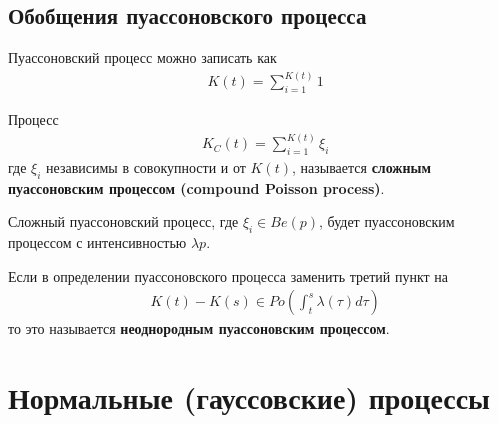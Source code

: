 \newpage
{}
\subsection{Обобщения пуассоновского процесса}
Пуассоновский процесс можно записать как
\begin{align*}
  & K(t) = \sum_{i=1}^{K(t)} 1
\end{align*}
\begin{Def}
    Процесс
    \begin{align*}
      & K_C(t) = \sum_{i=1}^{K(t)} \xi_i
    \end{align*}
    где $\xi_i$ независимы в совокупности и от $K(t)$, называется \textbf{сложным пуассоновским процессом (compound Poisson process)}.
\end{Def}
\begin{Prop}
    Сложный пуассоновский процесс, где $\xi_i \in Be(p)$, будет пуассоновским процессом с интенсивностью $\lambda p$.
\end{Prop}
\begin{Def}
    Если в определении пуассоновского процесса заменить третий пункт на
    \begin{align*}
      & K(t) - K(s) \in Po\left(\int_t^s \lambda(\tau) d\tau\right)
    \end{align*}
    то это называется \textbf{неоднородным пуассоновским процессом}.
\end{Def}
\section{Нормальные (гауссовские) процессы}

